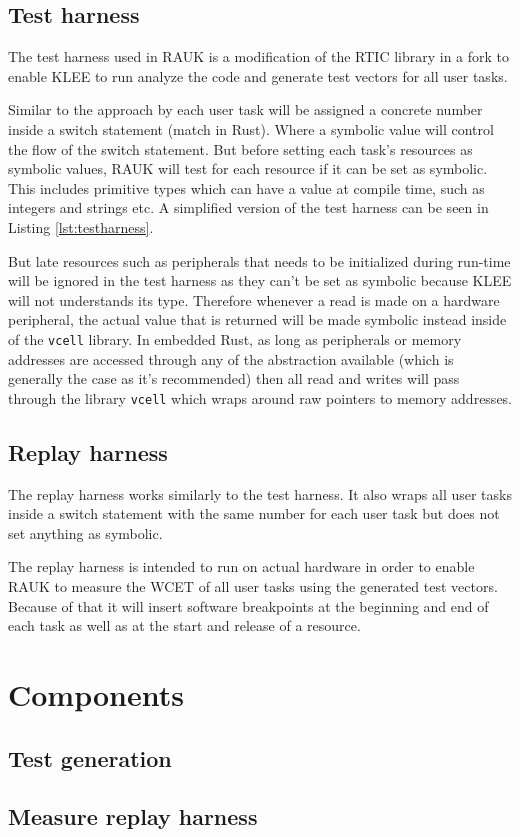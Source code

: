 \subsection{Test harness}
The test harness used in RAUK is a modification of the RTIC library in a fork
to enable KLEE to run analyze the code and generate test vectors for all user
tasks.

Similar to the approach by \cite{lindner} each user task will be assigned
a concrete number inside a switch statement (match in Rust). Where a symbolic
value will control the flow of the switch statement. But before setting each
task's resources as symbolic values, RAUK will test for each resource if it can
be set as symbolic. This includes primitive types which can have a value at
compile time, such as integers and strings etc. A simplified version of the test harness can be seen in Listing \ref{lst:testharness}.



But late resources such as peripherals that needs to be initialized during
run-time will be ignored in the test harness as they can't be set as symbolic
because KLEE will not understands its type. Therefore whenever a read is made
on a hardware peripheral, the actual value that is returned will be made
symbolic instead inside of the \texttt{vcell} library. In embedded Rust, as
long as peripherals or memory addresses are accessed through any of the
abstraction available (which is generally the case as it's recommended) then
all read and writes will pass through the library \texttt{vcell} which wraps
around raw pointers to memory addresses.

\subsection{Replay harness}
The replay harness works similarly to the test harness. It also wraps all user
tasks inside a switch statement with the same number for each user task but
does not set anything as symbolic.

The replay harness is intended to run on actual hardware in order to enable
RAUK to measure the WCET of all user tasks using the generated test vectors.
Because of that it will insert software breakpoints at the beginning and end of
each task as well as at the start and release of a resource.

\section{Components}

\subsection{Test generation}


\subsection{Measure replay harness}
